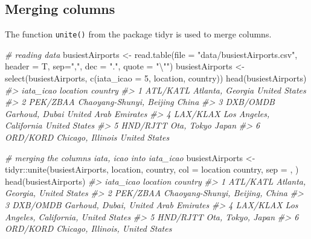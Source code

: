 \documentclass[
]{book}
\newenvironment{Shaded}{\begin{snugshade}}{\end{snugshade}}
\newcommand{\AttributeTok}[1]{\textcolor[rgb]{0.77,0.63,0.00}{#1}}
\newcommand{\CommentTok}[1]{\textcolor[rgb]{0.56,0.35,0.01}{\textit{#1}}}
\newcommand{\DecValTok}[1]{\textcolor[rgb]{0.00,0.00,0.81}{#1}}
\newcommand{\FunctionTok}[1]{\textcolor[rgb]{0.00,0.00,0.00}{#1}}
\newcommand{\NormalTok}[1]{#1}
\newcommand{\OtherTok}[1]{\textcolor[rgb]{0.56,0.35,0.01}{#1}}
\newcommand{\SpecialCharTok}[1]{\textcolor[rgb]{0.00,0.00,0.00}{#1}}
\newcommand{\StringTok}[1]{\textcolor[rgb]{0.31,0.60,0.02}{#1}}
\begin{document}
\hypertarget{merging-columns-1}{%
\subsection{Merging columns}\label{merging-columns-1}}

The function \texttt{unite()} from the package tidyr is used to merge columns.

\begin{Shaded}
\begin{Highlighting}[]
\CommentTok{\# reading data}
\NormalTok{busiestAirports }\OtherTok{\textless{}{-}} \FunctionTok{read.table}\NormalTok{(}\AttributeTok{file =} \StringTok{"data/busiestAirports.csv"}\NormalTok{, }
                              \AttributeTok{header =}\NormalTok{ T, }
                              \AttributeTok{sep=}\StringTok{","}\NormalTok{, }
                              \AttributeTok{dec =} \StringTok{"."}\NormalTok{, }
                              \AttributeTok{quote =} \StringTok{"}\SpecialCharTok{\textbackslash{}"}\StringTok{"}\NormalTok{)}
\NormalTok{busiestAirports }\OtherTok{\textless{}{-}} \FunctionTok{select}\NormalTok{(busiestAirports, }\FunctionTok{c}\NormalTok{(}\StringTok{\textquotesingle{}iata\_icao\textquotesingle{}} \OtherTok{=} \DecValTok{5}\NormalTok{, }\StringTok{\textquotesingle{}location\textquotesingle{}}\NormalTok{, }\StringTok{\textquotesingle{}country\textquotesingle{}}\NormalTok{))}
\FunctionTok{head}\NormalTok{(busiestAirports)}
\CommentTok{\#\textgreater{}   iata\_icao                 location              country}
\CommentTok{\#\textgreater{} 1  ATL/KATL         Atlanta, Georgia        United States}
\CommentTok{\#\textgreater{} 2  PEK/ZBAA Chaoyang{-}Shunyi, Beijing                China}
\CommentTok{\#\textgreater{} 3  DXB/OMDB           Garhoud, Dubai United Arab Emirates}
\CommentTok{\#\textgreater{} 4  LAX/KLAX  Los Angeles, California        United States}
\CommentTok{\#\textgreater{} 5  HND/RJTT               Ota, Tokyo                Japan}
\CommentTok{\#\textgreater{} 6  ORD/KORD        Chicago, Illinois        United States}

\CommentTok{\# merging the columns iata, icao into iata\_icao}
\NormalTok{busiestAirports }\OtherTok{\textless{}{-}} 
\NormalTok{  tidyr}\SpecialCharTok{::}\FunctionTok{unite}\NormalTok{(busiestAirports, location, country, }\AttributeTok{col =} \StringTok{\textasciigrave{}}\AttributeTok{location country}\StringTok{\textasciigrave{}}\NormalTok{, }\AttributeTok{sep =} \StringTok{\textquotesingle{}, \textquotesingle{}}\NormalTok{)}
\FunctionTok{head}\NormalTok{(busiestAirports)}
\CommentTok{\#\textgreater{}   iata\_icao                       location country}
\CommentTok{\#\textgreater{} 1  ATL/KATL        Atlanta, Georgia, United States}
\CommentTok{\#\textgreater{} 2  PEK/ZBAA        Chaoyang{-}Shunyi, Beijing, China}
\CommentTok{\#\textgreater{} 3  DXB/OMDB   Garhoud, Dubai, United Arab Emirates}
\CommentTok{\#\textgreater{} 4  LAX/KLAX Los Angeles, California, United States}
\CommentTok{\#\textgreater{} 5  HND/RJTT                      Ota, Tokyo, Japan}
\CommentTok{\#\textgreater{} 6  ORD/KORD       Chicago, Illinois, United States}
\end{Highlighting}
\end{Shaded}
\end{document}
